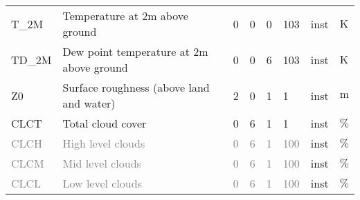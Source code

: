 \begin{longtable}{p{2.0cm}p{5.0cm}p{0.8cm}p{0.8cm}p{0.8cm}p{0.9cm}p{1cm}p{1cm}}
T\_2M                          &  Temperature at 2m above ground                                                        &               0                                   &                     0                       &                     0                      &               103                           &                      inst                   &        $\mathrm{K}$          \\
TD\_2M                         &  Dew point temperature at 2m above ground                                              &               0                                   &                     0                       &                     6                      &               103                           &                      inst                   &        $\mathrm{K}$          \\
Z0                             &  Surface roughness (above land and water)                                              &               2                                   &                     0                       &                     1                      &                 1                           &                      inst                   &        $\mathrm{m}$          \\
CLCT                           &  Total cloud cover                                                                     &               0                                   &                     6                       &                     1                      &                 1                           &                      inst                   &        $\mathrm{\%}$          \\
\textcolor{gray}{CLCH}         &  \textcolor{gray}{High level clouds}\footnotemark[3]                                   &               \textcolor{gray}{0}                 &                     \textcolor{gray}{6}     &                    \textcolor{gray}{1}     &                 \textcolor{gray}{100}       &                      inst                   &        $\mathrm{\%}$          \\
\textcolor{gray}{CLCM}         &  \textcolor{gray}{Mid level clouds}\footnotemark[3]                                    &               \textcolor{gray}{0}                 &                     \textcolor{gray}{6}     &                    \textcolor{gray}{1}     &                 \textcolor{gray}{100}       &                      inst                   &        $\mathrm{\%}$          \\
\textcolor{gray}{CLCL}         &  \textcolor{gray}{Low level clouds}\footnotemark[3]                                    &               \textcolor{gray}{0}                 &                     \textcolor{gray}{6}     &                    \textcolor{gray}{1}     &                 \textcolor{gray}{100}       &                      inst                   &        $\mathrm{\%}$          \\

\end{longtable}
